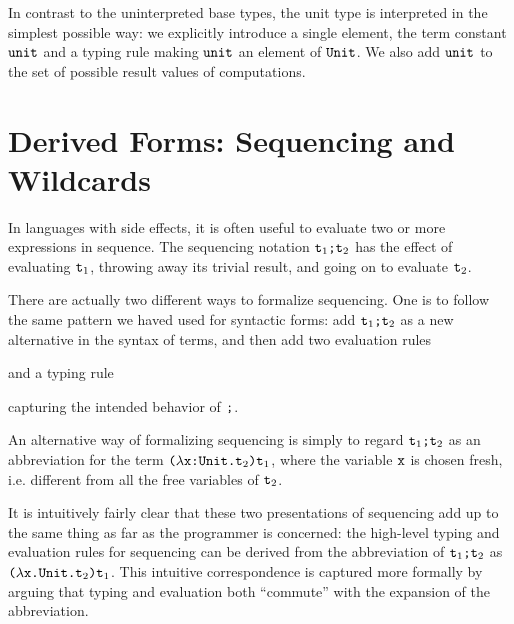 \documentclass[11pt,twoside=off,numbers=noenddot]{scrbook}
\begin{document}
In contrast to the uninterpreted base types, the unit type is
interpreted in the simplest possible way: we explicitly introduce a
single element, the term constant $\ttt{unit}$ and a typing rule
making $\ttt{unit}$ an element of $\ttt{Unit}$. We also add
$\ttt{unit}$ to the set of possible result values of computations.

\section{Derived Forms: Sequencing and Wildcards}
In languages with side effects, it is often useful to evaluate two or
more expressions in sequence. The sequencing notation
$\ttt{$\ttt{t}_1$;$\ttt{t}_2$}$ has the effect of evaluating
$\ttt{t}_1$, throwing away its trivial result, and going on to
evaluate $\ttt{t}_2$.

There are actually two different ways to formalize sequencing. One is
to follow the same pattern we haved used for syntactic forms: add
$\ttt{$\ttt{t}_1$;$\ttt{t}_2$}$ as a new alternative in the syntax of
terms, and then add two evaluation rules
\begin{prooftree}
\end{prooftree}

\begin{prooftree}
\end{prooftree}

and a typing rule
\begin{prooftree}
\end{prooftree}

capturing the intended behavior of $\ttt{;}$.

An alternative way of formalizing sequencing is simply to regard
$\ttt{$\ttt{t}_1$;$\ttt{t}_2$}$ as an abbreviation for the term
$\ttt{($\lambda$x:Unit.$\ttt{t}_2$)$\ttt{t}_1$}$, where the variable
$\ttt{x}$ is chosen fresh, i.e. different from all the free variables
of $\ttt{t}_2$.

It is intuitively fairly clear that these two presentations of
sequencing add up to the same thing as far as the programmer is
concerned: the high-level typing and evaluation rules for sequencing
can be derived from the abbreviation of
$\ttt{$\ttt{t}_1$;$\ttt{t}_2$}$ as
$\ttt{($\lambda$x.Unit.$\ttt{t}_2$)$\ttt{t}_1$}$. This intuitive
correspondence is captured more formally by arguing that typing and
evaluation both ``commute'' with the expansion of the abbreviation.
\end{document}
